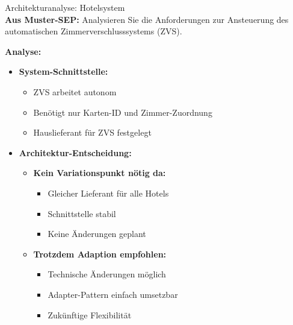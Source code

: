 \begin{example2}{Architekturanalyse: Hotelsystem}\\
\textbf{Aus Muster-SEP:} Analysieren Sie die Anforderungen zur Ansteuerung des automatischen Zimmerverschlusssystems (ZVS).

\textbf{Analyse:}
\begin{itemize}
    \item \textbf{System-Schnittstelle:}
    \begin{itemize}
        \item ZVS arbeitet autonom
        \item Benötigt nur Karten-ID und Zimmer-Zuordnung
        \item Hauslieferant für ZVS festgelegt
    \end{itemize}
    
    \item \textbf{Architektur-Entscheidung:}
    \begin{itemize}
        \item \textbf{Kein Variationspunkt nötig da:}
        \begin{itemize}
            \item Gleicher Lieferant für alle Hotels
            \item Schnittstelle stabil
            \item Keine Änderungen geplant
        \end{itemize}
        
        \item \textbf{Trotzdem Adaption empfohlen:}
        \begin{itemize}
            \item Technische Änderungen möglich
            \item Adapter-Pattern einfach umsetzbar
            \item Zukünftige Flexibilität
        \end{itemize}
    \end{itemize}
\end{itemize}
\end{example2}

